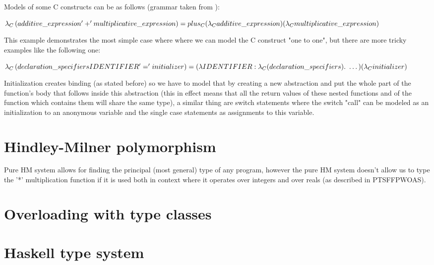 Models of some C constructs can be as follows (grammar taken from ): %

$
    \lambda_C\left(additive\_expression '+' multiplicative\_expression\right) = \\
    plus_C (\lambda_C additive\_expression) (\lambda_C multiplicative\_expression)
$

This example demonstrates the most simple case where  where we can model the C construct "one to one",
but there are more tricky examples like the following one:

$
    \lambda_C\left(declaration\_specifiers IDENTIFIER '=' initializer\right) = \\
    (\lambda IDENTIFIER : \lambda_C(declaration\_specifiers) .\ \dots) (\lambda_C initializer)
$

Initialization creates binding (as stated before) so we have to model that by creating a new abstraction and put the whole
part of the function's body that follows inside this abstraction (this in effect means that all the return values of these nested functions
and of the function which contains them will share the same type), a similar thing are switch statements where the switch "call" can be modeled
as an initialization to an anonymous variable and the single case statements as assignments to this variable.


\section{Hindley-Milner polymorphism}

Pure HM system allows for finding the principal (most general) type of any program, however
the pure HM system doesn't allow us to type the '*' multiplication function if it is used both
in context where it operates over integers and over reals (as described in PTSFFPWOAS). %


\section{Overloading with type classes}





\section{Haskell type system}

